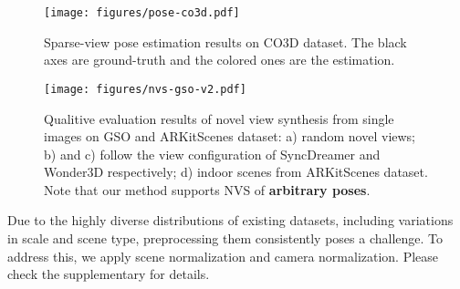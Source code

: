 \begin{figure*}[t]
    \centering
    \texttt{[image: figures/pose-co3d.pdf]}
    \vspace{-6mm}
    \caption{Sparse-view pose estimation results on CO3D dataset. The black axes are ground-truth and the colored ones are the estimation.
    }
    \vspace{-4mm}
    \label{fig:pose}
\end{figure*}

\begin{figure*}[t]
    \centering
    \texttt{[image: figures/nvs-gso-v2.pdf]}
    \vspace{-6mm}
    \caption{Qualitive evaluation results of novel view synthesis from single images on GSO and ARKitScenes dataset: a) random novel views; b) and c) follow the view configuration of SyncDreamer and Wonder3D respectively; d) indoor scenes from ARKitScenes dataset. Note that our method supports NVS of \textbf{arbitrary poses}.}
    \vspace{-4mm}
    \label{fig:nvs-gso}
\end{figure*}


Due to the highly diverse distributions of existing datasets, including variations in scale and scene type, preprocessing them consistently poses a challenge. To address this, we apply scene normalization and camera normalization. Please check the supplementary for details.


